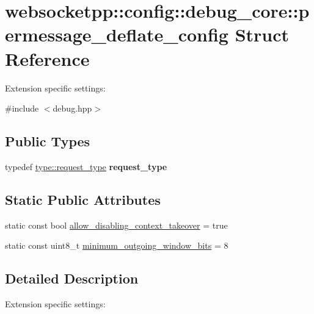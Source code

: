 \hypertarget{structwebsocketpp_1_1config_1_1debug__core_1_1permessage__deflate__config}{}\section{websocketpp\+:\+:config\+:\+:debug\+\_\+core\+:\+:permessage\+\_\+deflate\+\_\+config Struct Reference}
\label{structwebsocketpp_1_1config_1_1debug__core_1_1permessage__deflate__config}


Extension specific settings\+:  




{\ttfamily \#include $<$debug.\+hpp$>$}

\subsection*{Public Types}
\begin{DoxyCompactItemize}
\item 
typedef \hyperlink{classwebsocketpp_1_1http_1_1parser_1_1request}{type\+::request\+\_\+type} {\bfseries request\+\_\+type}\hypertarget{structwebsocketpp_1_1config_1_1debug__core_1_1permessage__deflate__config_aaf933a304bf66b1bdf5bec33fdf013a8}{}\label{structwebsocketpp_1_1config_1_1debug__core_1_1permessage__deflate__config_aaf933a304bf66b1bdf5bec33fdf013a8}

\end{DoxyCompactItemize}
\subsection*{Static Public Attributes}
\begin{DoxyCompactItemize}
\item 
static const bool \hyperlink{structwebsocketpp_1_1config_1_1debug__core_1_1permessage__deflate__config_a2c214b49d880b8ca1ebcce9c92d1dec6}{allow\+\_\+disabling\+\_\+context\+\_\+takeover} = true
\item 
static const uint8\+\_\+t \hyperlink{structwebsocketpp_1_1config_1_1debug__core_1_1permessage__deflate__config_ae9ce7b9a7a002339d80dca046e940867}{minimum\+\_\+outgoing\+\_\+window\+\_\+bits} = 8
\end{DoxyCompactItemize}


\subsection{Detailed Description}
Extension specific settings\+: 

